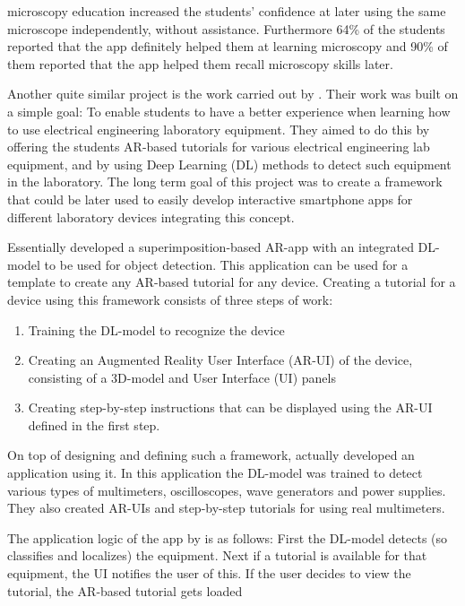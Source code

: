 microscopy education increased the students' confidence at later using the 
same microscope independently, without assistance. Furthermore 64\% of the 
students reported that the app definitely helped them at learning microscopy 
and 90\% of them reported that the app helped them recall microscopy skills 
later.\cite{pylvanainen} \par
	Another quite similar project is the work carried out by 
\textcite{estrada}. Their work was built on a simple goal: To enable students 
to have a better experience when learning how to use electrical engineering 
laboratory equipment. They aimed to do this by offering the students AR-based 
tutorials for various electrical engineering lab equipment, and by using Deep 
Learning (DL) methods to detect such equipment in the 
laboratory.\cite{estrada} The long term goal of this project was to create a 
framework that could be later used to easily develop interactive smartphone 
apps for different laboratory devices integrating this 
concept.\cite{estrada} \par
	Essentially \textcite{estrada} developed a superimposition-based 
AR-app with an integrated DL-model to be used for object detection. This 
application can be used for a template to create any AR-based tutorial for 
any device. Creating a tutorial for a device using this framework consists of 
three steps of work:
\begin{enumerate}
	\item Training the DL-model to recognize the device
	\item Creating an Augmented Reality User Interface (AR-UI) of the device, consisting of a 3D-model and User Interface (UI) panels
	\item Creating step-by-step instructions that can be displayed using the AR-UI defined in the first step.
\end{enumerate} \par
	On top of designing and defining such a framework, \textcite{estrada} 
actually developed an application using it. In this application the DL-model 
was trained to detect various types of multimeters, oscilloscopes, wave 
generators and power supplies. They also created AR-UIs and step-by-step 
tutorials for using real multimeters.\cite{estrada}\par
	The application logic of the app by \textcite{estrada} is as follows: 
First the DL-model detects (so classifies and localizes) the equipment. Next 
if a tutorial is available for that equipment, the UI notifies the user of this.
If the user decides to view the tutorial, the AR-based tutorial gets loaded 
